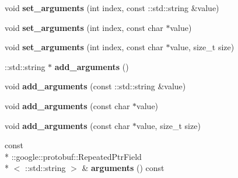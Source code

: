 \begin{DoxyCompactItemize}
\item 
\hypertarget{classSimpleChat_1_1ChatCommand_a7ae743707068ed6ab7effe3ffe403683}{void {\bfseries set\-\_\-arguments} (int index, const \-::std\-::string \&value)}\label{classSimpleChat_1_1ChatCommand_a7ae743707068ed6ab7effe3ffe403683}

\item 
\hypertarget{classSimpleChat_1_1ChatCommand_aaaf34f8602b40e6e7ee042a968444561}{void {\bfseries set\-\_\-arguments} (int index, const char $\ast$value)}\label{classSimpleChat_1_1ChatCommand_aaaf34f8602b40e6e7ee042a968444561}

\item 
\hypertarget{classSimpleChat_1_1ChatCommand_a8843db32f49ccc95df7be81ac87ef30b}{void {\bfseries set\-\_\-arguments} (int index, const char $\ast$value, size\-\_\-t size)}\label{classSimpleChat_1_1ChatCommand_a8843db32f49ccc95df7be81ac87ef30b}

\item 
\hypertarget{classSimpleChat_1_1ChatCommand_a090d38819c8aa1abdbbcead218c6bbc1}{\-::std\-::string $\ast$ {\bfseries add\-\_\-arguments} ()}\label{classSimpleChat_1_1ChatCommand_a090d38819c8aa1abdbbcead218c6bbc1}

\item 
\hypertarget{classSimpleChat_1_1ChatCommand_a8b40c75dca550be48ff0bd0e269ff044}{void {\bfseries add\-\_\-arguments} (const \-::std\-::string \&value)}\label{classSimpleChat_1_1ChatCommand_a8b40c75dca550be48ff0bd0e269ff044}

\item 
\hypertarget{classSimpleChat_1_1ChatCommand_a01eecca4297ef851470a470be454c714}{void {\bfseries add\-\_\-arguments} (const char $\ast$value)}\label{classSimpleChat_1_1ChatCommand_a01eecca4297ef851470a470be454c714}

\item 
\hypertarget{classSimpleChat_1_1ChatCommand_ac500d8d945c3095f8767f466afe236ae}{void {\bfseries add\-\_\-arguments} (const char $\ast$value, size\-\_\-t size)}\label{classSimpleChat_1_1ChatCommand_ac500d8d945c3095f8767f466afe236ae}

\item 
\hypertarget{classSimpleChat_1_1ChatCommand_aad2c143cb18fd209c50eb9744e9eaa28}{const \\*
\-::google\-::protobuf\-::\-Repeated\-Ptr\-Field\\*
$<$ \-::std\-::string $>$ \& {\bfseries arguments} () const }\label{classSimpleChat_1_1ChatCommand_aad2c143cb18fd209c50eb9744e9eaa28}


\end{DoxyCompactItemize}
